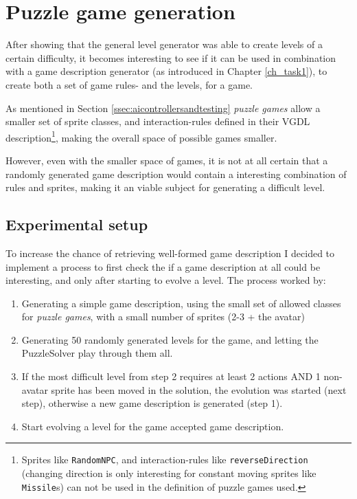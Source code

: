 \documentclass[a4paper,titlepage,final]{report}
\begin{document}
\section{Puzzle game generation} 
\label{sec_task3evolvingGames}
After showing that the general level generator was able to create levels of a certain difficulty, it becomes interesting to see if it can be used in combination with a game description generator (as introduced in Chapter \ref{ch_task1}), to create both a set of game rules- and the levels, for a game.

As mentioned in Section \ref{ssec:aicontrollersandtesting} \textit{puzzle games} allow a smaller set of sprite classes, and interaction-rules defined in their VGDL description\footnote{Sprites like \texttt{RandomNPC}, and interaction-rules like \texttt{reverseDirection} (changing direction is only interesting for constant moving sprites like \texttt{Missile}s) can not be used in the definition of puzzle games used.}, making the overall space of possible games smaller.

However, even with the smaller space of games, it is not at all certain that a randomly generated game description would contain a interesting combination of rules and sprites, making it an viable subject for generating a difficult level.

\subsection{Experimental setup} 
To increase the chance of retrieving well-formed game description I decided to implement a process to first check the if a game description at all could be interesting, and only after starting to evolve a level.
The process worked by:

\begin{enumerate}
\item Generating a simple game description, using the small set of allowed classes for \textit{puzzle games}, with a small number of sprites (2-3 + the avatar)
\item Generating 50 randomly generated levels for the game, and letting the PuzzleSolver play through them all.
\item If the most difficult level from step 2 requires at least 2 actions AND 1 non-avatar sprite has been moved in the solution, the evolution was started (next step), otherwise a new game description is generated (step 1).
\item Start evolving a level for the game accepted game description.
\end{enumerate}
\end{document}
